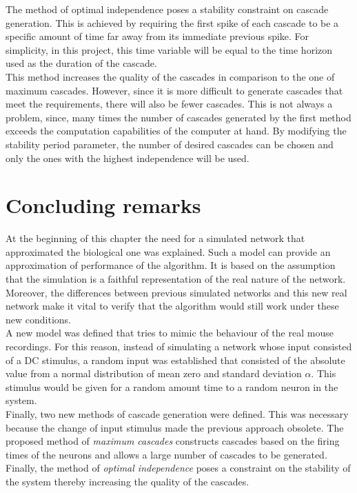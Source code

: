 The method of optimal independence poses a stability constraint on cascade generation. This is achieved by requiring the first spike of each cascade to be a specific amount of time far away from its immediate previous spike. For simplicity, in this project, this time variable will be equal to the time horizon used as the duration of the cascade.\\

This method increases the quality of the cascades in comparison to the one of maximum cascades. However, since it is more difficult to generate cascades that meet the requirements, there will also be fewer cascades. This is not always a problem, since, many times the number of cascades generated by the first method exceeds the computation capabilities of the computer at hand. By modifying the stability period parameter, the number of desired cascades can be chosen and only the ones with the highest independence will be used.

\section{Concluding remarks}

At the beginning of this chapter the need for a simulated network that approximated the biological one was explained. Such a model can provide an approximation of performance of the algorithm. It is based on the assumption that the simulation is a faithful representation of the real nature of the network. Moreover, the differences between previous simulated networks and this new real network make it vital to verify that the algorithm would still work under these new conditions. \\

A new model was defined that tries to mimic the behaviour of the real mouse recordings. For this reason, instead of simulating a network whose input consisted of a DC stimulus, a random input was established that consisted of the absolute value from a normal distribution of mean zero and standard deviation \(\alpha\). This stimulus would be given for a random amount time to a random neuron in the system. \\

Finally, two new methods of cascade generation were defined. This was necessary because the change of input stimulus made the previous approach obsolete. The proposed method of \textit{maximum cascades} constructs cascades based on the firing times of the neurons and allows a large number of cascades to be generated. Finally, the method of \textit{optimal independence} poses a constraint on the stability of the system thereby increasing the quality of the cascades.








